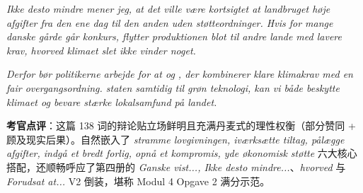 \begin{answerbox}
\textit{Ikke desto mindre mener jeg, at det ville være kortsigtet at  landbruget høje afgifter fra den ene dag til den anden uden støtteordninger. Hvis for mange danske gårde går konkurs, flytter produktionen blot til andre lande med lavere krav, hvorved klimaet slet ikke vinder noget.}

\textit{Derfor bør politikerne arbejde for at  og , der kombinerer klare klimakrav med en fair overgangsordning.  staten samtidig  til grøn teknologi, kan vi både beskytte klimaet og bevare stærke lokalsamfund på landet.}

\small\textbf{考官点评}：这篇 138 词的辩论贴立场鲜明且充满丹麦式的理性权衡（部分赞同 + 顾及现实后果）。自然嵌入了 \textit{stramme lovgivningen, iværksætte tiltag, pålægge afgifter, indgå et bredt forlig, opnå et kompromis, yde økonomisk støtte} 六大核心搭配，还顺畅呼应了第四册的 \textit{Ganske vist..., Ikke desto mindre...}、\textit{hvorved} 与 \textit{Forudsat at...} V2 倒装，堪称 Modul 4 Opgave 2 满分示范。
\end{answerbox}
